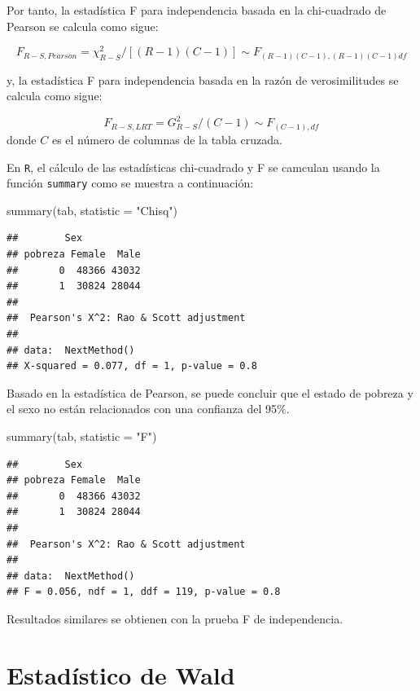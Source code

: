 \documentclass[
  12pt,
]{book}
\newenvironment{Shaded}{\begin{snugshade}}{\end{snugshade}}
\newcommand{\AttributeTok}[1]{\textcolor[rgb]{0.77,0.63,0.00}{#1}}
\newcommand{\FunctionTok}[1]{\textcolor[rgb]{0.00,0.00,0.00}{#1}}
\newcommand{\NormalTok}[1]{#1}
\newcommand{\StringTok}[1]{\textcolor[rgb]{0.31,0.60,0.02}{#1}}
\begin{document}
Por tanto, la estadística F para independencia basada en la chi-cuadrado de Pearson se calcula como sigue:

\[
F_{R-S,Pearson}=\chi_{R-S}^{2}\big/\left[\left(R-1\right)\left(C-1\right)\right]\sim F_{\left(R-1\right)\left(C-1\right),\left(R-1\right)\left(C-1\right)df}
\]

y, la estadística F para independencia basada en la razón de verosimilitudes se calcula como sigue:

\[
F_{R-S,LRT}=G_{R-S}^{2}\big/\left(C-1\right)\sim F_{\left(C-1\right),df}
\]
donde \(C\) es el número de columnas de la tabla cruzada.

En \texttt{R}, el cálculo de las estadísticas chi-cuadrado y F se camculan usando la función \texttt{summary} como se muestra a continuación:

\begin{Shaded}
\begin{Highlighting}[]
\FunctionTok{summary}\NormalTok{(tab, }\AttributeTok{statistic =} \StringTok{"Chisq"}\NormalTok{)}
\end{Highlighting}
\end{Shaded}

\begin{verbatim}
##        Sex
## pobreza Female  Male
##       0  48366 43032
##       1  30824 28044
## 
##  Pearson's X^2: Rao & Scott adjustment
## 
## data:  NextMethod()
## X-squared = 0.077, df = 1, p-value = 0.8
\end{verbatim}

Basado en la estadística de Pearson, se puede concluir que el estado de pobreza y el sexo no están relacionados con una confianza del 95\%.

\begin{Shaded}
\begin{Highlighting}[]
\FunctionTok{summary}\NormalTok{(tab, }\AttributeTok{statistic =} \StringTok{"F"}\NormalTok{)}
\end{Highlighting}
\end{Shaded}

\begin{verbatim}
##        Sex
## pobreza Female  Male
##       0  48366 43032
##       1  30824 28044
## 
##  Pearson's X^2: Rao & Scott adjustment
## 
## data:  NextMethod()
## F = 0.056, ndf = 1, ddf = 119, p-value = 0.8
\end{verbatim}

Resultados similares se obtienen con la prueba F de independencia.

\hypertarget{estaduxedstico-de-wald}{%
\section{Estadístico de Wald}\label{estaduxedstico-de-wald}}
\end{document}
